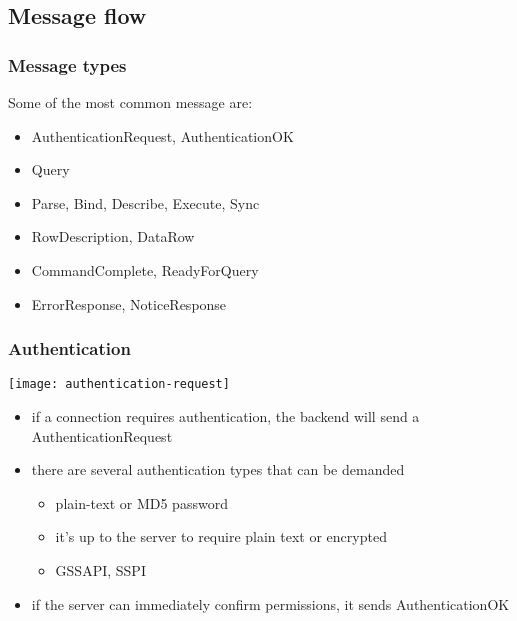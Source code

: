 \documentclass{beamer}
\begin{document}
\subsection{Message flow}

\begin{frame}
  \frametitle{Message types}

  Some of the most common message are:

  \begin{itemize}
  \item AuthenticationRequest, AuthenticationOK
  \item Query
  \item Parse, Bind, Describe, Execute, Sync
  \item RowDescription, DataRow
  \item CommandComplete, ReadyForQuery
  \item ErrorResponse, NoticeResponse
  \end{itemize}

\end{frame}

\begin{frame}
  \frametitle{Authentication}

  \begin{center}
    \texttt{[image: authentication-request]}
  \end{center}

  \begin{itemize}
  \item if a connection requires authentication, the backend will send a
    AuthenticationRequest
  \item there are several authentication types that can be demanded
    \begin{itemize}
    \item plain-text or MD5 password
    \item it's up to the server to require plain text or encrypted
    \item GSSAPI, SSPI
    \end{itemize}
  \item if the server can immediately confirm permissions, it sends
    AuthenticationOK
  \end{itemize}
\end{frame}
\end{document}
